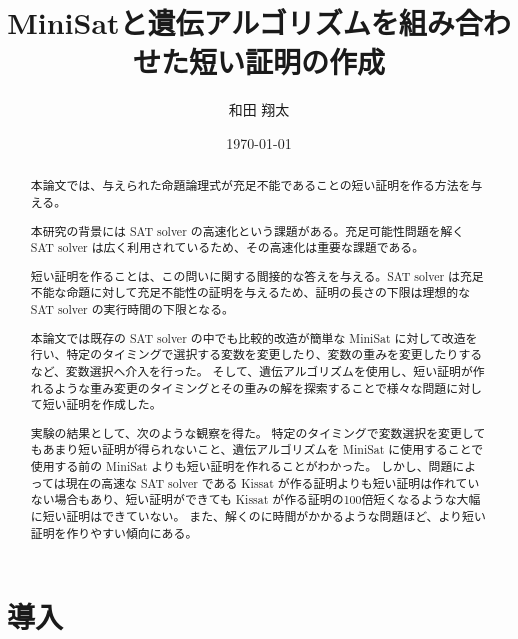 \documentclass[titlepage]{jsarticle}
\title{MiniSatと遺伝アルゴリズムを組み合わせた短い証明の作成}
\author{和田 翔太}
\date{\today}
\begin{document}
\maketitle





\begin{abstract}
	本論文では、与えられた命題論理式が充足不能であることの短い証明を作る方法を与える。

	本研究の背景には SAT solver の高速化という課題がある。充足可能性問題を解く SAT solver は広く利用されているため、その高速化は重要な課題である。

	短い証明を作ることは、この問いに関する間接的な答えを与える。SAT solver は充足不能な命題に対して充足不能性の証明を与えるため、証明の長さの下限は理想的な SAT solver の実行時間の下限となる。 

	本論文では既存の SAT solver の中でも比較的改造が簡単な MiniSat に対して改造を行い、特定のタイミングで選択する変数を変更したり、変数の重みを変更したりするなど、変数選択へ介入を行った。
	そして、遺伝アルゴリズムを使用し、短い証明が作れるような重み変更のタイミングとその重みの解を探索することで様々な問題に対して短い証明を作成した。

	実験の結果として、次のような観察を得た。
	特定のタイミングで変数選択を変更してもあまり短い証明が得られないこと、遺伝アルゴリズムを MiniSat に使用することで使用する前の MiniSat よりも短い証明を作れることがわかった。
	しかし、問題によっては現在の高速な SAT solver である Kissat が作る証明よりも短い証明は作れていない場合もあり、短い証明ができても Kissat が作る証明の100倍短くなるような大幅に短い証明はできていない。
	また、解くのに時間がかかるような問題ほど、より短い証明を作りやすい傾向にある。
\end{abstract}
















\section{導入}

\begin{comment}
\begin{figure}[t]
 	\texttt{[image: figures/apple.png]}
	\caption{りんごの写真}
\end{figure}
\end{comment}
\end{document}
